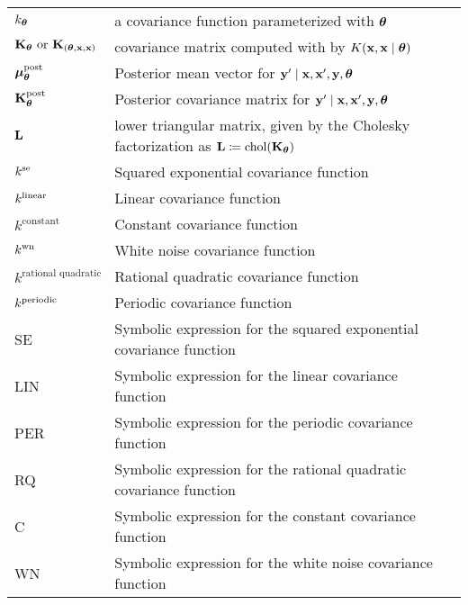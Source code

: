 \begin{tabular}{l l}
$k_{\bm{\theta}}$			&  a covariance function parameterized with
$\bm{\theta}$\\

$\mathbf{K}_{\bm{\theta}}\text{ or }\mathbf{K}_{(\bm{\theta},\mathbf{x},\mathbf{x})}$		&  covariance matrix
computed with by $K(\mathbf{x},\mathbf{x} \mid \bm{\theta})$   \\
$\bm{\mu}_{\bm{\theta}}^\text{post}$ &  Posterior mean vector for $\mathbf{y}^\prime \mid \mathbf{x}, \mathbf{x}^\prime, \mathbf{y}, \bm{\theta}$ \\
$\mathbf{K}_{\bm{\theta}}^\text{post}$     &  Posterior covariance matrix for $\mathbf{y}^\prime \mid \mathbf{x}, \mathbf{x}^\prime, \mathbf{y}, \bm{\theta}$ \\
$\mathbf{L}$			&lower triangular matrix, given by the Cholesky factorization as 
$\mathbf{L}\coloneqq \text{chol}(\mathbf{K}_{\bm{\theta}})$\\

$k^\text{se}$ &  Squared exponential covariance function  \\
$k^\text{linear}$ &  Linear covariance function  \\
$k^{\text{constant}}$ &  Constant covariance function  \\
$k^\text{wn}$ &  White noise covariance function  \\
$k^{\text{rational quadratic}}$  &  Rational quadratic covariance function  \\
$k^\text{periodic}$ &  Periodic covariance function  \\
SE			&  Symbolic expression for the squared exponential covariance function  \\
LIN		        &  Symbolic expression for the linear covariance function  \\
PER		        &  Symbolic expression for the periodic covariance function  \\
RQ		        &  Symbolic expression for the rational quadratic covariance function  \\
C		        &  Symbolic expression for the constant covariance function  \\
WN		        &  Symbolic expression for the white noise covariance function  \\
\end{tabular}
\newpage
